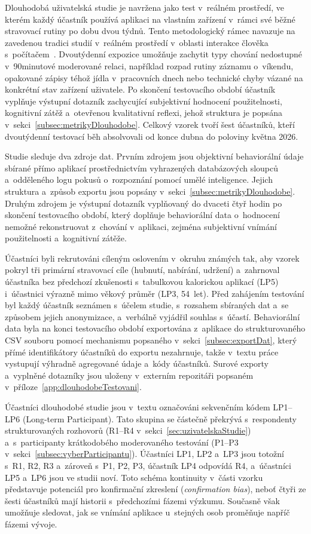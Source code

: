 Dlouhodobá uživatelská studie je navržena jako test v~reálném prostředí, ve kterém každý účastník používá aplikaci na vlastním zařízení v~rámci své běžné stravovací rutiny po dobu dvou týdnů.
Tento metodologický rámec navazuje na zavedenou tradici studií v~reálném prostředí v~oblasti interakce člověka s~počítačem~\cite{brown2011intoTheWild, rogers2017researchInWild}.
Dvoutýdenní expozice umožňuje zachytit typy chování nedostupné v~90minutové moderované relaci, například rozpad rutiny záznamu o~víkendu, opakované zápisy téhož jídla v~pracovních dnech nebo technické chyby vázané na konkrétní stav zařízení uživatele.
Po skončení testovacího období účastník vyplňuje výstupní dotazník zachycující subjektivní hodnocení použitelnosti, kognitivní zátěž a~otevřenou kvalitativní reflexi, jehož struktura je popsána v~sekci~\ref{subsec:metrikyDlouhodobe}.
Celkový vzorek tvoří šest účastníků, kteří dvoutýdenní testovací běh absolvovali od konce dubna do poloviny května 2026.

Studie sleduje dva zdroje dat.
Prvním zdrojem jsou objektivní behaviorální údaje sbírané přímo aplikací prostřednictvím vyhrazených databázových sloupců a~odděleného logu pokusů o~rozpoznání pomocí umělé inteligence. Jejich struktura a~způsob exportu jsou popsány v~sekci~\ref{subsec:metrikyDlouhodobe}.
Druhým zdrojem je výstupní dotazník vyplňovaný do dvaceti čtyř hodin po skončení testovacího období, který doplňuje behaviorální data o~hodnocení nemožné rekonstruovat z~chování v~aplikaci, zejména subjektivní vnímání použitelnosti a~kognitivní zátěže.

Účastníci byli rekrutováni cíleným oslovením v~okruhu známých tak, aby vzorek pokryl tři primární stravovací cíle (hubnutí, nabírání, udržení) a~zahrnoval účastníka bez předchozí zkušenosti s~tabulkovou kalorickou aplikací (LP5) i~účastnici výrazně mimo věkový průměr (LP3, 54~let).
Před zahájením testování byl každý účastník seznámen s~účelem studie, s~rozsahem sbíraných dat a~se způsobem jejich anonymizace, a~verbálně vyjádřil souhlas s~účastí.
Behaviorální data byla na konci testovacího období exportována z~aplikace do strukturovaného CSV souboru pomocí mechanismu popsaného v~sekci~\ref{subsec:exportDat}, který přímé identifikátory účastníků do exportu nezahrnuje, takže v~textu práce vystupují výhradně agregované údaje a~kódy účastníků.
Surové exporty a~vyplněné dotazníky jsou uloženy v~externím repozitáři popsaném v~příloze~\ref{app:dlouhodobeTestovani}.

Účastníci dlouhodobé studie jsou v~textu označováni sekvenčním kódem LP1--LP6 (Long-term Participant).
Tato skupina se částečně překrývá s~respondenty strukturovaných rozhovorů (R1--R4 v~sekci~\ref{sec:uzivatelskaStudie}) a~s~participanty krátkodobého moderovaného testování (P1--P3 v~sekci~\ref{subsec:vyberParticipantu}). Účastníci LP1, LP2 a~LP3 jsou totožní s~R1, R2, R3 a~zároveň s~P1, P2, P3, účastník LP4 odpovídá R4, a~účastníci LP5 a~LP6 jsou ve studii noví.
Toto schéma kontinuity v~části vzorku představuje potenciál pro konfirmační zkreslení (\emph{confirmation bias}), neboť čtyři ze šesti účastníků mají historii s~předchozími fázemi výzkumu. Současně však umožňuje sledovat, jak se vnímání aplikace u~stejných osob proměňuje napříč fázemi vývoje.

